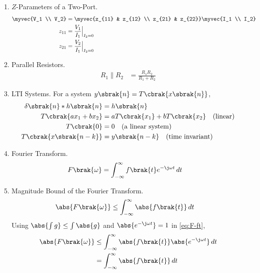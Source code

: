\begin{enumerate}[label=\thesubsection.\arabic*, ref=\thesubsection.\theenumi]
\begin{align}
\\
\omega L &= \frac{1}{\omega C}
\\
C &= \frac{1}{\omega^2 L}
\label{eq:F-resonance}
\end{align}
\item $Z$-Parameters of a Two-Port.
\begin{align}
\myvec{V_1 \\ V_2} &= \myvec{z_{11} & z_{12} \\ z_{21} & z_{22}} \myvec{I_1 \\ I_2}
\label{eq:F-zdef}
\\
z_{11} &= \frac{V_1}{I_1}\Big|_{I_2 = 0}
\\
z_{21} &= \frac{V_2}{I_1}\Big|_{I_2 = 0}
\label{eq:F-zparam}
\end{align}
\item Parallel Resistors.
\begin{align}
R_1 \parallel R_2 &= \frac{R_1 R_2}{R_1 + R_2}
\label{eq:F-rnet}
\end{align}
\item LTI Systems. For a system $y\sbrak{n} = T\cbrak{x\sbrak{n}}$,
\begin{align}
\delta\sbrak{n} * h\sbrak{n} &= h\sbrak{n}
\label{eq:F-conv}
\\
T\cbrak{a x_1 + b x_2} &= a T\cbrak{x_1} + b T\cbrak{x_2} \quad \text{(linear)}
\label{eq:F-linear}
\\
T\cbrak{0} &= 0 \quad \text{(a linear system)}
\label{eq:F-zero}
\\
T\cbrak{x\sbrak{n - k}} &= y\sbrak{n - k} \quad \text{(time invariant)}
\label{eq:F-ti}
\end{align}
\item Fourier Transform.
\begin{align}
F\brak{\omega} &= \int_{-\infty}^{\infty} f\brak{t} e^{-\j \omega t} \,dt
\label{eq:F-ft}
\end{align}
\item Magnitude Bound of the Fourier Transform.
\begin{align}
\abs{F\brak{\omega}} &\le \int_{-\infty}^{\infty} \abs{f\brak{t}} \,dt
\label{eq:F-ft-bound}
\end{align}
\solution Using $\abs{\int g} \le \int \abs{g}$ and $\abs{e^{-\j \omega t}} = 1$ in \eqref{eq:F-ft},
\begin{align}
\abs{F\brak{\omega}} &\le \int_{-\infty}^{\infty} \abs{f\brak{t}} \abs{e^{-\j \omega t}} \,dt
\\
&= \int_{-\infty}^{\infty} \abs{f\brak{t}} \,dt
\end{align}

\end{enumerate}

